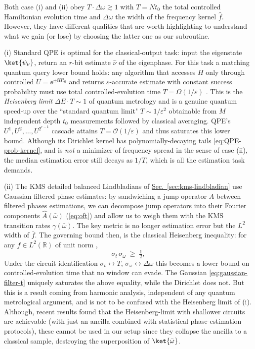 Both case (i) and (ii) obey $T\cdot\Delta\omega \gtrsim 1$ with $T = Nt_0$ the total controlled Hamiltonian evolution time and $\Delta \omega$ the width of the frequency kernel $\hat{f}$. However, they have different qualities that are worth highlighting to understand what we gain (or lose) by choosing the latter one as our subroutine.

(i) Standard QPE is optimal for the classical-output task: input the eigenstate $\ket{\psi_\nu}$, return an $r$-bit estimate $\hat{\nu}$ of the eigenphase. For this task a matching quantum query lower bound holds: any algorithm that accesses $H$ only through controlled $U = \ee^{\pm \ii H t_0}$ and returns $\varepsilon$-accurate estimate with constant success probability must use total controlled-evolution time $T = \Omega(1/\varepsilon)$ \cite{giovannetti2006quantum}. This is the \emph{Heisenberg limit} $\Delta E \cdot T \sim 1$ of quantum metrology and is a genuine quantum speed-up over the ``standard quantum limit" $T\sim1/\varepsilon^2$ obtainable from $M$ independent depth $t_0$ measurements followed by classical averaging. QPE's $U^1, U^2, \ldots, U^{2^{r-1}}$ cascade attains $T = \mathcal{O}(1 / \varepsilon)$ \cite{bible} and thus saturates this lower bound. Although its Dirichlet kernel has polynomially-decaying tails \eqref{eq:QPE-prob-kernel}, and is \emph{not} a minimizer of frequency spread in the sense of case (ii), the median estimation error still decays as $1 / T$, which is all the estimation task demands.

(ii) The KMS detailed balanced Lindbladians of \hyperref[sec:kms-lindbladian]{Sec.~\ref*{sec:kms-lindbladian}} use Gaussian filtered phase estimates: by sandwiching a jump operator $A$ between filtered phases estimations, we can decompose jump operators into their Fourier components $\hat{A}(\bar{\omega})$ (\eqref{eq:oft}) and allow us to weigh them with the KMS transition rates $\gamma(\bar{\omega})$. The key metric is no longer estimation error but the $L^2$ width of $\bar{f}$. The governing bound then, is the classical Heisenberg inequality: for any $f\in L^2(\mathbb{R})$ of unit norm \cite{folland1997uncertainty}, 
$$
\sigma_t\,\sigma_\omega \;\geq\; \tfrac{1}{2},
$$
Under the circuit identification $\sigma_t \leftrightarrow T$, $\sigma_\omega \leftrightarrow \Delta\omega$ this becomes a lower bound on controlled-evolution time that no window can evade. The Gaussian \eqref{eq:gaussian-filter-t} uniquely saturates the above equality, while the Dirichlet does not. But this is a result coming from harmonic analysis, independent of any quantum metrological argument, and is not to be confused with the Heisenberg limit of (i). Although, recent results found that the Heisenberg-limit with shallower circuits are achievable \cite{ding2023even} (with just an ancilla combined with statistical phase-estimation protocols), these cannot be used in our setup since they collapse the ancilla to a classical sample, destroying the superposition of $\ket{\bar{\omega}}$.

